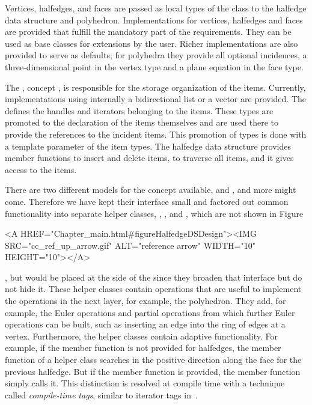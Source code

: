 Vertices, halfedges, and faces are passed as local types of the
 class to the halfedge data structure and polyhedron.
Implementations for vertices, halfedges and faces are provided that
fulfill the mandatory part of the requirements. They can be used as
base classes for extensions by the user. Richer implementations are
also provided to serve as defaults; for polyhedra they provide all
optional incidences, a three-dimensional point in the vertex type and
a plane equation in the face type.

The , concept , is
responsible for the storage organization of the items. Currently,
implementations using internally a bidirectional list or a
vector are provided. The  defines the handles and iterators
belonging to the items. These types are promoted to the declaration of
the items themselves and are used there to provide the references to
the incident items. This promotion of types is done with a template
parameter  of the item types.  The halfedge data structure
provides member functions to insert and delete items, to traverse all
items, and it gives access to the items.

There are two different models for the  concept available,
 and , and more might come.
Therefore we have kept their interface small and factored out common
functionality into separate helper classes, ,
, and ,
which are not shown in
Figure~\ccTexHtml{\ref{figureHalfedgeDSDesign}}{}\begin{ccHtmlOnly} <A
HREF="Chapter_main.html#figureHalfedgeDSDesign"><IMG
SRC="cc_ref_up_arrow.gif" ALT="reference arrow" WIDTH="10"
HEIGHT="10"></A>
\end{ccHtmlOnly}, but would be placed at the side of the 
since they broaden that interface but do not hide it.  These helper
classes contain operations that are useful to implement the operations
in the next layer, for example, the polyhedron. They add, for example,
the Euler operations and partial operations from which further Euler
operations can be built, such as inserting an edge into the ring of
edges at a vertex.  Furthermore, the helper classes contain adaptive
functionality.  For example, if the  member function is
not provided for halfedges, the  member function of
a helper class searches in the positive direction along the face for
the previous halfedge. But if the  member function is
provided, the  member function simply calls it. This
distinction is resolved at compile time with a technique called {\em
compile-time tags}, similar to iterator tags in~\cite{cgal:sl-stl-95}.

